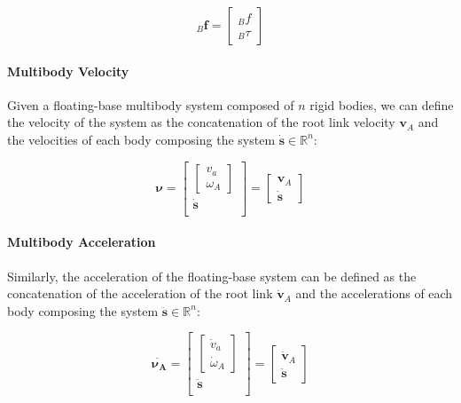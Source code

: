 \begin{equation}
    {}_{B}\mathbf{f} = \begin{bmatrix}
        {}_{B}f \\
        {}_{B}\tau
    \end{bmatrix}
\end{equation}

\paragraph{Multibody Velocity} Given a floating-base multibody system composed of $n$ rigid bodies, we can define the velocity of the system as the concatenation of the root link velocity $\mathbf{v}_A$ and the velocities of each body composing the system $\dot{\mathbf{s}} \in \mathbb{R} ^{n}$:

\begin{equation}
    \boldsymbol{\nu} = \begin{bmatrix}
        \begin{bmatrix} v _a \\ \omega _A \end{bmatrix} \\
        \dot{\mathbf{s}}                                \\
    \end{bmatrix} = \begin{bmatrix}
        \mathbf{v}_A \\
        \dot{\mathbf{s}}
    \end{bmatrix}
\end{equation}

\paragraph{Multibody Acceleration} Similarly, the acceleration of the floating-base system can be defined as the concatenation of the acceleration of the root link $\dot{\mathbf{v}} _A$ and the accelerations of each body composing the system $\ddot{\mathbf{s}} \in \mathbb{R} ^{n}$:

\begin{equation}
    \dot{\boldsymbol{\nu _A}} = \begin{bmatrix}
        \begin{bmatrix} \dot{v} _a \\ \dot{\omega} _A \end{bmatrix} \\
        \ddot{\mathbf{s}}                                           \\
    \end{bmatrix} = \begin{bmatrix}
        \dot{\mathbf{v}}_A \\
        \ddot{\mathbf{s}}
    \end{bmatrix}
\end{equation}

